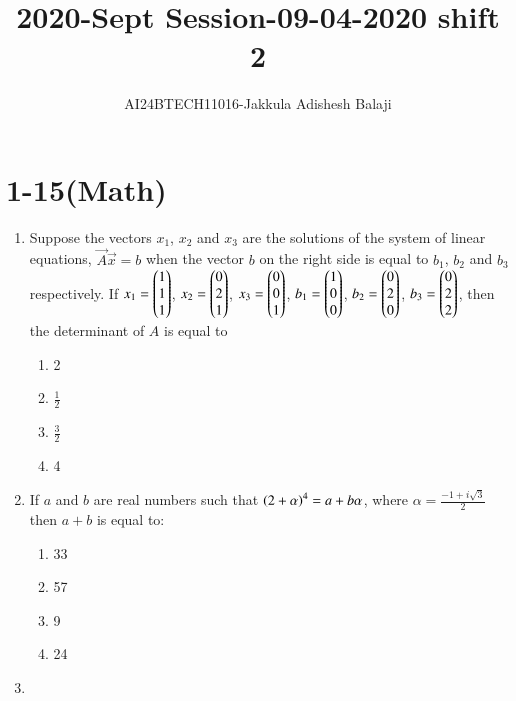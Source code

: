 \documentclass[journal]{IEEEtran}
\begin{document}

\title{2020-Sept Session-09-04-2020 shift 2}
\author{AI24BTECH11016-Jakkula Adishesh Balaji}
{\let\newpage\relax\maketitle}
\renewcommand{\thefigure}{\theenumi}
\renewcommand{\thetable}{\theenumi}
\setlength{\intextsep}{10pt} %
\renewcommand{\thetable}{\theenumi}
\section{1-15(Math)}
\begin{enumerate}
	\item
	Suppose the vectors $x_1$, $x_2$ and $x_3$ are the solutions of the system of linear equations, $\vec{A}\vec{x} = b$ when the vector $b$ on the right side is equal to $b_1$, $b_2$ and $b_3$ respectively. If $x_1 = \begin{pmatrix}1 \\ 1 \\ 1\end{pmatrix}$, $x_2 = \begin{pmatrix}0 \\ 2 \\ 1\end{pmatrix}$, $x_3 = \begin{pmatrix}0 \\ 0 \\ 1\end{pmatrix}$, $b_1 = \begin{pmatrix}1 \\ 0 \\ 0\end{pmatrix}$, $b_2 = \begin{pmatrix}0 \\ 2 \\ 0\end{pmatrix}$, $b_3 = \begin{pmatrix}0 \\ 2 \\2\end{pmatrix}$, then the determinant of $A$ is equal to 
		\begin{enumerate}
			\item 2
			\item $\frac{1}{2}$
			\item $\frac{3}{2}$
			\item 4
		\end{enumerate}
	\item
	 If $a$ and $b$ are real numbers such that $\left(2+\alpha\right)^{4} = a+b\alpha$, where $\alpha = \frac{-1+i\sqrt{3}}{2}$ then $a+b$ is equal to:
	 	\begin{enumerate}
	 		\item 33
	 		\item 57
	 		\item 9
	 		\item 24
	 	\end{enumerate}
	\item

\end{enumerate}
\end{document}
